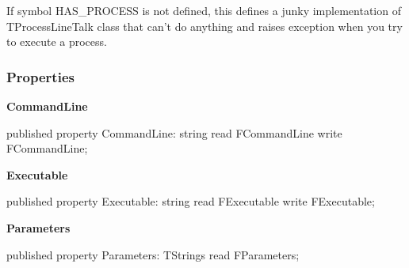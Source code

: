 \documentclass{report}
\newif\ifpdf
\begin{document}
If symbol HAS{\_}PROCESS is not defined, this defines a junky implementation of TProcessLineTalk class that can't do anything and raises exception when you try to execute a process.\subsubsection*{\large{\textbf{Properties}}\normalsize\hspace{1ex}\hfill}
\begin{list}{}{
\setlength{\itemindent}{0cm}
\setlength{\listparindent}{0cm}
\setlength{\leftmargin}{\evensidemargin}
\addtolength{\leftmargin}{\tmplength}
\settowidth{\labelsep}{X}
\addtolength{\leftmargin}{\labelsep}
\setlength{\labelwidth}{\tmplength}
}
\label{PasDoc_ProcessLineTalk.TProcessLineTalk-CommandLine}
\item[\textbf{CommandLine}\hfill]
\ifpdf
\begin{flushleft}
\fi
\begin{ttfamily}
published property CommandLine: string read FCommandLine write FCommandLine;\end{ttfamily}

\ifpdf
\end{flushleft}
\fi


\par  \label{PasDoc_ProcessLineTalk.TProcessLineTalk-Executable}
\item[\textbf{Executable}\hfill]
\ifpdf
\begin{flushleft}
\fi
\begin{ttfamily}
published property Executable: string read FExecutable write FExecutable;\end{ttfamily}

\ifpdf
\end{flushleft}
\fi


\par  \label{PasDoc_ProcessLineTalk.TProcessLineTalk-Parameters}
\item[\textbf{Parameters}\hfill]
\ifpdf
\begin{flushleft}
\fi
\begin{ttfamily}
published property Parameters: TStrings read FParameters;\end{ttfamily}

\ifpdf
\end{flushleft}
\fi


\par  \end{list}
\end{document}
